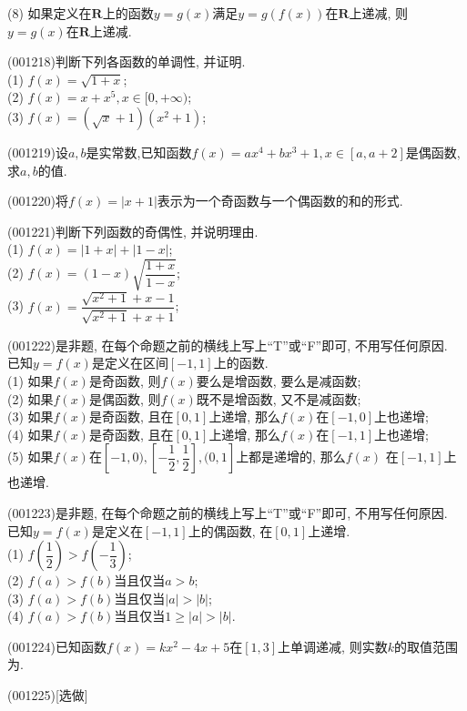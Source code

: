 (8) 如果定义在$\mathbf{R}$上的函数$y=g(x)$满足$y=g(f(x))$在$\mathbf{R}$上递减, 则$y=g(x)$在$\mathbf{R}$上递减.
\item (001218)判断下列各函数的单调性, 并证明.\\ 
(1) $f(x)=\sqrt{1+x}$;\\ 
(2) $f(x)=x+x^5,x\in[0,+\infty)$;\\ 
(3) $f(x)=(\sqrt{x}+1)(x^2+1)$;
\item (001219)设$a,b$是实常数,已知函数$f(x)=ax^4+bx^3+1,x\in[a,a+2]$是偶函数, 求$a,b$的值.
\item (001220)将$f(x)=|x+1|$表示为一个奇函数与一个偶函数的和的形式.
\item (001221)判断下列函数的奇偶性, 并说明理由.\\ 
(1) $f(x)=|1+x|+|1-x|$;\\ 
(2) $f(x)=(1-x)\sqrt{\dfrac{1+x}{1-x}}$;\\ 
(3) $f(x)=\dfrac{\sqrt{x^2+1}+x-1}{\sqrt{x^2+1}+x+1}$;
\item (001222)是非题, 在每个命题之前的横线上写上``T''或``F''即可, 不用写任何原因.\\ 
已知$y=f(x)$是定义在区间$[-1,1]$上的函数.\\ 
(1) 如果$f(x)$是奇函数, 则$f(x)$要么是增函数, 要么是减函数;\\ 
(2) 如果$f(x)$是偶函数, 则$f(x)$既不是增函数, 又不是减函数;\\ 
(3) 如果$f(x)$是奇函数, 且在$[0,1]$上递增, 那么$f(x)$在$[-1,0]$上也递增;\\ 
(4) 如果$f(x)$是奇函数, 且在$[0,1]$上递增, 那么$f(x)$在$[-1,1]$上也递增;\\ 
(5) 如果$f(x)$在$[-1,0),[-\dfrac{1}{2},\dfrac{1}{2}],(0,1]$上都是递增的, 那么$f(x)$ 在$[-1,1]$上也递增.
\item (001223)是非题, 在每个命题之前的横线上写上``T''或``F''即可, 不用写任何原因.\\ 
已知$y=f(x)$是定义在$[-1,1]$上的偶函数, 在$[0,1]$上递增.\\ 
(1) $f(\dfrac{1}{2})>f(-\dfrac{1}{3})$;\\ 
(2) $f(a)>f(b)$当且仅当$a>b$;\\ 
(3) $f(a)>f(b)$当且仅当$|a|>|b|$;\\ 
(4) $f(a)>f(b)$当且仅当$1\ge |a|>|b|$.
\item (001224)已知函数$f(x)=kx^2-4x+5$在$[1,3]$上单调递减, 则实数$k$的取值范围为.
\item (001225)[选做]
